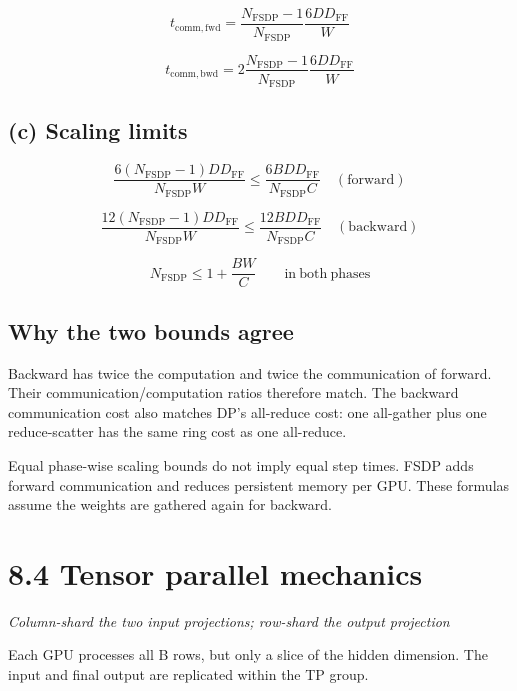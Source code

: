\documentclass[10pt,a4paper]{article}
\begin{document}
\[\boxed{t_{\mathrm{comm,fwd}}=\frac{N_{\mathrm{FSDP}}-1}{N_{\mathrm{FSDP}}}\frac{6DD_{\mathrm{FF}}}{W}}\]

\[\boxed{t_{\mathrm{comm,bwd}}=2\frac{N_{\mathrm{FSDP}}-1}{N_{\mathrm{FSDP}}}\frac{6DD_{\mathrm{FF}}}{W}}\]

\subsection*{(c) Scaling limits}

\[\frac{6(N_{\mathrm{FSDP}}-1)DD_{\mathrm{FF}}}{N_{\mathrm{FSDP}}W}\leq\frac{6BDD_{\mathrm{FF}}}{N_{\mathrm{FSDP}}C}\quad(\mathrm{forward})\]

\[\frac{12(N_{\mathrm{FSDP}}-1)DD_{\mathrm{FF}}}{N_{\mathrm{FSDP}}W}\leq\frac{12BDD_{\mathrm{FF}}}{N_{\mathrm{FSDP}}C}\quad(\mathrm{backward})\]

\[\boxed{N_{\mathrm{FSDP}}\leq 1+\frac{BW}{C}\qquad\mathrm{in\ both\ phases}}\]

\subsection*{Why the two bounds agree}

Backward has twice the computation and twice the communication of forward. Their communication/computation ratios therefore match. The backward communication cost also matches DP's all-reduce cost: one all-gather plus one reduce-scatter has the same ring cost as one all-reduce.\par

Equal phase-wise scaling bounds do not imply equal step times. FSDP adds forward communication and reduces persistent memory per GPU. These formulas assume the weights are gathered again for backward.\par

\clearpage

\section*{8.4 \textperiodcentered{} Tensor parallel mechanics}

\textit{Column-shard the two input projections; row-shard the output projection}\par

Each GPU processes all B rows, but only a slice of the hidden dimension. The input and final output are replicated within the TP group.\par
\end{document}
